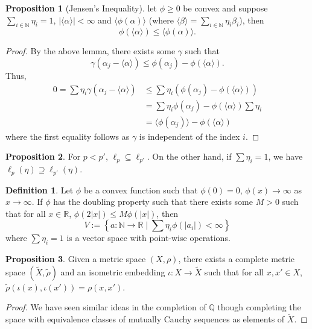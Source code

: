 \documentclass[]{article}
\theoremstyle{definition}
\theoremstyle{definition}
\newtheorem{definition}{Definition}[section]
\newtheorem{proposition}{Proposition}[section]
\begin{document}
\begin{proposition}[Jensen's Inequality]
  let \(\phi \ge 0\) be convex and suppose \(\sum_{i \in \mathbb{N}} \eta_i = 1\), 
  \(|\langle \alpha \rangle| < \infty\) and \(\langle \phi(\alpha) \rangle\) 
  (where \(\langle \beta \rangle = \sum_{i \in \mathbb{N}} \eta_i \beta_i\)), 
  then 
  \[\phi(\langle \alpha \rangle) \le \langle \phi(\alpha) \rangle.\]
\end{proposition}
\begin{proof}
  By the above lemma, there exists some \(\gamma\) such that 
  \[\gamma(\alpha_j - \langle \alpha \rangle) \le 
    \phi(\alpha_j) - \phi(\langle \alpha \rangle).\]
  Thus, 
  \[\begin{split}
    0 = \sum \eta_i \gamma(\alpha_j - \langle \alpha \rangle) 
      & \le \sum \eta_i (\phi(\alpha_j) - \phi(\langle \alpha \rangle)) \\
      & = \sum \eta_i \phi(\alpha_j) - \phi(\langle \alpha \rangle) \sum \eta_i \\
      & = \langle \phi(\alpha_j) \rangle - \phi(\langle \alpha \rangle)
    \end{split}\]
  where the first equality follows as \(\gamma\) is independent of the index 
  \(i\).
\end{proof}

\begin{proposition}
  For \(p < p'\), \(\ell_p \subseteq \ell_{p'}\). On the other hand, if 
  \(\sum \eta_i = 1\), we have \(\ell_p(\eta) \supseteq \ell_{p'}(\eta)\).
\end{proposition}

\begin{definition}
  Let \(\phi\) be a convex function such that \(\phi(0) = 0\), 
  \(\phi(x) \to \infty\) as \(x \to \infty\). If \(\phi\) has the doubling 
  property such that there exists some \(M > 0\) such that for all 
  \(x \in \mathbb{R}\), \(\phi(2 |x|) \le M \phi(|x|)\), then 
  \[V := \left\{a : \mathbb{N} \to \mathbb{R} \mid \sum \eta_i 
    \phi(|a_i|) < \infty\right\}\]
  where \(\sum \eta_i = 1\) is a vector space with point-wise operations.
\end{definition}

\begin{proposition}
  Given a metric space \((X, \rho)\), there exists a complete metric space 
  \((\tilde X, \tilde \rho)\) and an isometric embedding 
  \(\iota : X \to \tilde X\) such that for all \(x, x' \in X\),
  \(\tilde \rho(\iota(x), \iota(x')) = \rho(x, x')\).
\end{proposition}
\begin{proof}
  We have seen similar ideas in the completion of \(\mathbb{Q}\) though 
  completing the space with equivalence classes of mutually Cauchy sequences 
  as elements of \(\tilde X\).
\end{proof}
\end{document}
